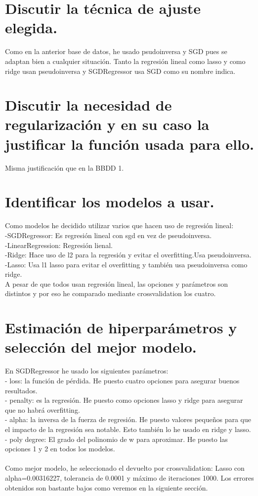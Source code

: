 \documentclass[12pt]{article}
\begin{document}
\section{Discutir la técnica de ajuste elegida.}
Como en la anterior base de datos, he usado psudoinversa y SGD pues se adaptan bien a cualquier situación. Tanto la regresión lineal como lasso y como ridge usan pseudoinversa y SGDRegressor usa SGD como su nombre indica.

\section{Discutir la necesidad de regularización y en su caso la justificar la función usada para ello.}

Misma justificación que en la BBDD 1.


\section{Identificar los modelos a usar.}

Como modelos he decidido utilizar varios que hacen uso de regresión lineal:\\
-SGDRegressor: Es regresión lineal con sgd en vez de pseudoinversa.\\
-LinearRegression: Regresión lienal.\\
-Ridge: Hace uso de l2 para la regresión y evitar el overfitting.Usa pseudoinversa.\\
-Lasso: Usa l1 lasso para evitar el overfitting y también usa pseudoinversa como ridge.\\
A pesar de que todos usan regresión lineal, las opciones y parámetros son distintos y por eso he comparado mediante crossvalidation los cuatro.

\section{Estimación de hiperparámetros y selección del mejor modelo.}

En SGDRegressor he usado los siguientes parámetros:\\
- loss: la función de pérdida. He puesto cuatro opciones para asegurar buenos resultados. \\
- penalty: es la regresión. He puesto como opciones lasso y ridge para asegurar que no habrá overfitting.\\
- alpha: la inversa de la fuerza de regresión. He puesto valores pequeños para que el impacto de la regresión sea notable. Esto también lo he usado en ridge y lasso.\\
- poly degree: El grado del polinomio de w para aproximar. He puesto las opciones 1 y 2 en todos los modelos.\\\\
Como mejor modelo, he seleccionado el devuelto por crossvalidation: Lasso con alpha=0.00316227, tolerancia de 0.0001 y máximo de iteraciones 1000. Los errores obtenidos son bastante bajos como veremos en la siguiente sección.
\end{document}
